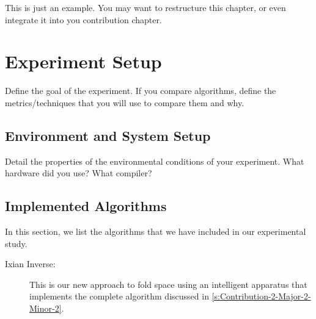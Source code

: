
This is just an example. You may want to restructure this chapter, or even integrate it into you contribution chapter. 

\section{Experiment Setup}
\label{s:Experiment-Setup}

Define the goal of the experiment. If you compare algorithms, define the metrics/techniques that you will use to compare them and why.


\subsection{Environment and System Setup}
\label{s:Experiment-Env}

Detail the properties of the environmental conditions of your experiment. What hardware did you use? What compiler?


\subsection{Implemented Algorithms}
\label{s:Experiment-Algo}


In this section, we list the algorithms that we have included in our experimental study.

\begin{description} 
  

  \item[Ixian Inverse:] This is our new approach to fold space using an intelligent apparatus that implements the complete algorithm discussed in \autoref{s:Contribution-2-Major-2-Minor-2}.

\end{description}


